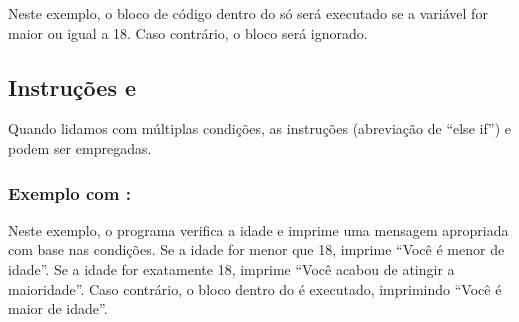 \documentclass[letterpaper,10pt,english]{jupyterBook}
\begin{document}
\begin{sphinxVerbatim}[commandchars=\\\{\}]
  

   
\end{sphinxVerbatim}

\sphinxAtStartPar
Neste exemplo, o bloco de código dentro do  só será executado se a variável  for maior ou igual a 18. Caso contrário, o bloco será ignorado.


\subsection{Instruções  e }
\label{\detokenize{chapters/ch4/ch4:instrucoes-elif-e-else}}
\sphinxAtStartPar
Quando lidamos com múltiplas condições, as instruções  (abreviação de “else if”) e  podem ser empregadas.


\subsubsection{Exemplo com :}
\label{\detokenize{chapters/ch4/ch4:exemplo-com-elif}}
\begin{sphinxVerbatim}[commandchars=\\\{\}]
  

   
   
\end{sphinxVerbatim}

\sphinxAtStartPar
Neste exemplo, o programa verifica a idade e imprime uma mensagem apropriada com base nas condições. Se a idade for menor que 18, imprime “Você é menor de idade”. Se a idade for exatamente 18, imprime “Você acabou de atingir a maioridade”. Caso contrário, o bloco dentro do  é executado, imprimindo “Você é maior de idade”.
\end{document}
